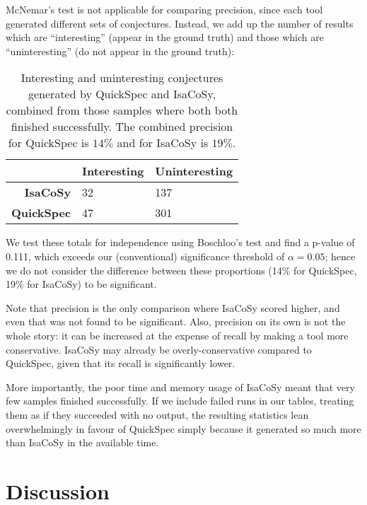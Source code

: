McNemar's test is not applicable for comparing precision, since each tool
generated different sets of conjectures. Instead, we add up the number of
results which are ``interesting'' (appear in the ground truth) and those which
are ``uninteresting'' (do not appear in the ground truth):

\begin{table}
  \centering
  \begin{tabular}{ |r|l|l| }
    \hline
              & \bfseries Interesting & \bfseries Uninteresting \\
    \hline
    \bfseries IsaCoSy   & 32          & 137      \\
    \hline
    \bfseries QuickSpec & 47          & 301      \\
    \hline
  \end{tabular}
  \caption{Interesting and uninteresting conjectures generated by QuickSpec and
    IsaCoSy, combined from those samples where both both finished successfully.
    The combined precision for QuickSpec is $14\%$ and for IsaCoSy is $19\%$.}
  \label{table:precision}
\end{table}

We test these totals for independence using Boschloo's test and find a p-value
of 0.111, which exceeds our (conventional) significance threshold of
$\alpha = 0.05$; hence we do not consider the difference between these
proportions (14\% for QuickSpec, 19\% for IsaCoSy) to be significant.

Note that precision is the only comparison where IsaCoSy scored higher, and even
that was not found to be significant. Also, precision on its own is not the
whole story: it can be increased at the expense of recall by making a tool more
conservative. IsaCoSy may already be overly-conservative compared to QuickSpec,
given that its recall is significantly lower.

More importantly, the poor time and memory usage of IsaCoSy meant that very few
samples finished successfully. If we include failed runs in our tables, treating
them as if they succeeded with no output, the resulting statistics lean
overwhelmingly in favour of QuickSpec simply because it generated so much more
than IsaCoSy in the available time.

\section{Discussion}
\label{sec:discussion}

